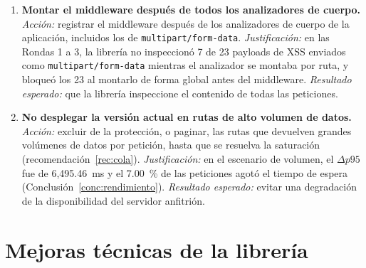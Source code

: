 \begin{enumerate}
    \item \textbf{Montar el middleware después de todos los analizadores de cuerpo.}
    \textit{Acción:} registrar el middleware después de los analizadores de cuerpo de la aplicación,
    incluidos los de \texttt{multipart/form-data}. \textit{Justificación:} en las Rondas 1 a 3, la
    librería no inspeccionó 7 de 23 payloads de XSS enviados como \texttt{multipart/form-data}
    mientras el analizador se montaba por ruta, y bloqueó los 23 al montarlo de forma global antes
    del middleware. \textit{Resultado esperado:} que la librería inspeccione el contenido de todas
    las peticiones.

    \item \textbf{No desplegar la versión actual en rutas de alto volumen de datos.}
    \textit{Acción:} excluir de la protección, o paginar, las rutas que devuelven grandes volúmenes
    de datos por petición, hasta que se resuelva la saturación (recomendación~\ref{rec:cola}).
    \textit{Justificación:} en el escenario de volumen, el $\Delta p95$ fue de 6{,}495.46~ms y el
    7.00~\% de las peticiones agotó el tiempo de espera (Conclusión~\ref{conc:rendimiento}).
    \textit{Resultado esperado:} evitar una degradación de la disponibilidad del servidor anfitrión.
\end{enumerate}

\section{Mejoras técnicas de la librería}

